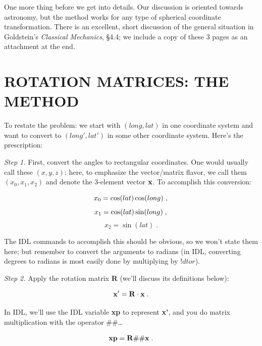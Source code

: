 \documentclass[11pt,preprint]{aastex}
\begin{document}
	One more thing before we get into details. Our discussion is
oriented towards astronomy, but the method works for any type of
spherical coordinate transformation. There is an excellent, short
discussion of the general situation in Goldstein's {\it Classical
Mechanics}, \S 4.4; we include a copy of these 3 pages as an attachment
at the end.

\section {ROTATION MATRICES: THE METHOD}

	To restate the problem: we start with $(long, lat)$ in one
coordinate system and want to convert to $(long', lat')$ in some other
coordinate system. Here's the prescription:

	{\it Step 1.} First, convert the angles to rectangular
coordinates.  One would usually call these $(x, y, z)$; here, to
emphasize the vector/matrix flavor, we call them $(x_0, x_1, x_2)$ and
denote the 3-element vector ${\bf x}$.  To accomplish this conversion:

\begin{mathletters}
\begin{equation}
x_0 = \cos(lat) \cos(long) \; , \\
\end{equation}
\begin{equation}
x_1 = \cos(lat) \sin(long) \; , \\
\end{equation}
\begin{equation}
x_2 = \sin(lat) \; .
\end{equation}
\end{mathletters}

\noindent The IDL commands to accomplish this should be obvious, so we
won't state them here; but remember to convert the arguments to radians
(in IDL, converting degrees to radians is most easily done by
multiplying by $!dtor$). 

	{\it Step 2.} Apply the rotation matrix {\bf R} (we'll discuss its
definitions below): 

\begin{equation}
{\bf x'} = {\bf R \cdot x} \; .
\end{equation}

\noindent In IDL, we'll use the IDL variable {\bf xp} to represent {\bf
x'}, and you do matrix multiplication with the operator $\#\#$\dots

\begin{equation}
{\bf xp} = {\bf R} \#\# {\bf x} \; .
\end{equation}
\end{document}
